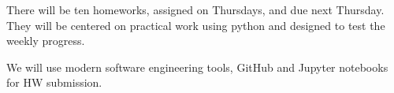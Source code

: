 \documentclass[10pt]{article}
\begin{document}
\vskip 0.2in


There will be ten homeworks, assigned on Thursdays, and due next Thursday. They will
be centered on practical work using python and designed to test the weekly progress. 

We will use modern software engineering tools, GitHub and Jupyter notebooks for HW submission. 
\end{document}

